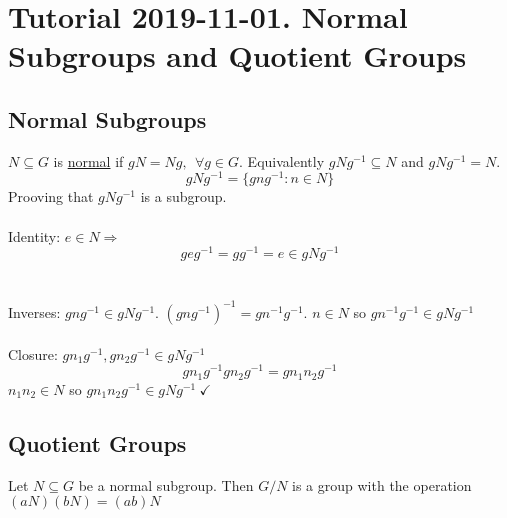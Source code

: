 \documentclass[class=scrartcl, crop=false]{standalone}
\begin{document}
\section{Tutorial 2019-11-01. Normal Subgroups and Quotient Groups}

\subsection{Normal Subgroups}

$N \subseteq G$ is \ul{normal} if $gN = Ng, \ \ \forall g \in G$. Equivalently $gNg^{-1} \subseteq N$ and $gNg^{-1} = N$.
\[
  gNg^{-1} = \{gng^{-1}: n \in N\}
\]
Prooving that $gNg^{-1}$ is a subgroup.
\\\\
Identity: $e \in N \Rightarrow$ 
\[
  geg^{-1} = gg^{-1} = e \in gNg^{-1}
\]
\\\\
Inverses: $gng^{-1} \in gNg^{-1}$. $(gng^{-1})^{-1} = gn^{-1}g^{-1}$. $n \in N$ so $gn^{-1}g^{-1} \in gNg^{-1}$
\\\\
Closure:
$gn_1g^{-1}, gn_2g^{-1} \in gNg^{-1}$
\[
  gn_1g^{-1}gn_2g^{-1} = gn_1n_2g^{-1}
\]
$n_1n_2 \in N$ so $gn_1n_2g^{-1} \in gNg^{-1} \ \checkmark$

\subsection{Quotient Groups}

Let $N \subseteq G$ be a normal subgroup. Then $G / N$ is a group with the operation $(aN)(bN) = (ab)N$
\end{document}
